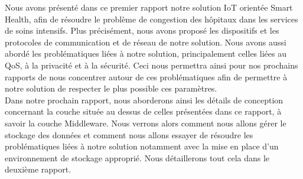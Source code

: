 \documentclass{article}
\begin{document}
Nous avons présenté dans ce premier rapport notre solution IoT orientée Smart Health, afin de résoudre le problème de congestion des hôpitaux dans les services de soins intensifs. Plus précisément, nous avons proposé les dispositifs et les protocoles de communication et de réseau de notre solution. Nous avons aussi abordé les problématiques liées à notre solution, principalement celles liées au QoS, à la privacité et à la sécurité. Ceci nous permettra ainsi pour nos prochains rapports de nous concentrer autour de ces problématiques afin de permettre à notre solution de respecter le plus possible ces paramètres.
\\

Dans notre prochain rapport, nous aborderons ainsi les détails de conception concernant la couche située au dessus de celles présentées dans ce rapport, à savoir la couche Middleware. Nous verrons alors comment nous allons gérer le stockage des données et comment nous allons essayer de résoudre les problématiques liées à notre solution notamment avec la mise en place d’un environnement de stockage approprié. Nous détaillerons tout cela dans le deuxième rapport.







\end{document}

